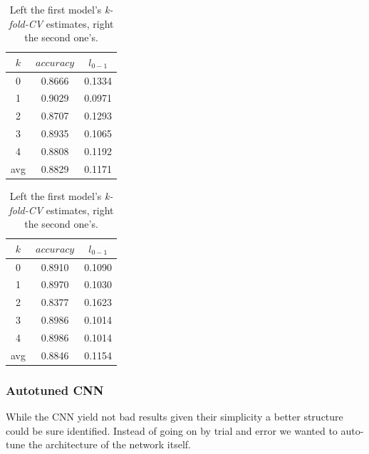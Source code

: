 \begin{table}
    \centering
    \begin{tabular}{ | c | c | c | }
        \hline
        $k$ & $accuracy$ & $l_{0-1}$ \\
        \hline\hline
        0   & 0.8666     & 0.1334    \\
        \hline
        1   & 0.9029     & 0.0971    \\
        \hline
        2   & 0.8707     & 0.1293    \\
        \hline
        3   & 0.8935     & 0.1065    \\
        \hline
        4   & 0.8808     & 0.1192    \\
        \hline
        \hline
        avg & 0.8829     & 0.1171    \\
        \hline
    \end{tabular}
    \quad
    \begin{tabular}{| c | c | c |}
        \hline
        $k$ & $accuracy$ & $l_{0-1}$ \\
        \hline\hline
        0   & 0.8910     & 0.1090    \\
        \hline
        1   & 0.8970     & 0.1030    \\
        \hline
        2   & 0.8377     & 0.1623    \\
        \hline
        3   & 0.8986     & 0.1014    \\
        \hline
        4   & 0.8986     & 0.1014    \\
        \hline
        \hline
        avg & 0.8846     & 0.1154    \\
        \hline
    \end{tabular}
    \caption{
        Left the first model's \textit{k-fold-CV} estimates, right the second one's.
    }

    \label{tab:kfoldcnn}
\end{table}

\subsubsection{Autotuned CNN}
While the CNN yield not bad results given their simplicity a better structure could be sure identified.
Instead of going on by trial and error we wanted to auto-tune the architecture of the network itself.

